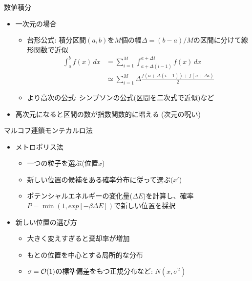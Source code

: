 \documentclass[dvipdfmx]{beamer}
\begin{document}
\begin{frame}[t,fragile]{数値積分}
  \begin{itemize}
    \setlength{\itemsep}{1em}
  \item 一次元の場合
    \begin{itemize}
    \item 台形公式: 積分区間$(a,b)$を$M$個の幅$\Delta=(b-a)/M$の区間に分けて線形関数で近似
      \begin{align*}
        \int_a^b f(x) \, dx &= \sum_{i=1}^M \int_{a+\Delta (i-1)}^{a+\Delta i} f(x) \, dx \\
        &\simeq \sum_{i=1}^M \Delta \frac{f({a+\Delta (i-1)}) + f({a+\Delta i})}{2}
      \end{align*}
    \item より高次の公式: シンプソンの公式(区間を二次式で近似)など
    \end{itemize}
    \item 高次元になると区間の数が指数関数的に増える (次元の呪い)
  \end{itemize}
\end{frame}

\begin{frame}[t,fragile]{マルコフ連鎖モンテカルロ法}
  \begin{itemize}
    \setlength{\itemsep}{1em}
  \item メトロポリス法
    \begin{itemize}
    \item 一つの粒子を選ぶ(位置$x$)
    \item 新しい位置の候補をある確率分布に従って選ぶ($x'$)
    \item ポテンシャルエネルギーの変化量($\Delta E$)を計算し、確率$P=\min(1,exp[-\beta\Delta E])$で新しい位置を採択
    \end{itemize}
  \item 新しい位置の選び方
    \begin{itemize}
    \item 大きく変えすぎると棄却率が増加
    \item もとの位置を中心とする局所的な分布
    \item $\sigma={\cal O}(1)$の標準偏差をもつ正規分布など: $N(x, \sigma^2)$
    \end{itemize}
  \end{itemize}
\end{frame}
\end{document}
